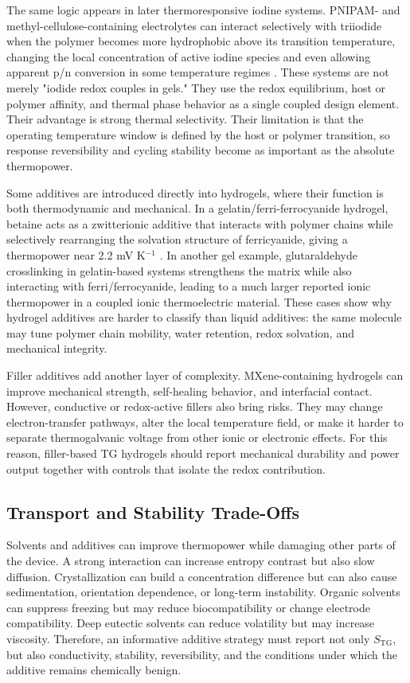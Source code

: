 The same logic appears in later thermoresponsive iodine systems. PNIPAM- and
methyl-cellulose-containing electrolytes can interact selectively with
triiodide when the polymer becomes more hydrophobic above its transition
temperature, changing the local concentration of active iodine species and even
allowing apparent p/n conversion in some temperature regimes
\citep{duan2019pn}. These systems are not merely "iodide redox couples in
gels." They use the redox equilibrium, host or polymer affinity, and thermal
phase behavior as a single coupled design element. Their advantage is strong
thermal selectivity. Their limitation is that the operating temperature window is
defined by the host or polymer transition, so response reversibility and
cycling stability become as important as the absolute thermopower.

Some additives are introduced directly into hydrogels, where their function is
both thermodynamic and mechanical. In a gelatin/ferri-ferrocyanide hydrogel,
betaine acts as a zwitterionic additive that interacts
with polymer chains while selectively rearranging the solvation structure of
ferricyanide, giving a thermopower near 2.2 mV K$^{-1}$
\citep{lu2024zwitterion}. In another gel example, glutaraldehyde crosslinking in
gelatin-based systems strengthens the matrix while also interacting with
ferri/ferrocyanide, leading to a much larger reported ionic thermopower in a
coupled ionic thermoelectric material. These cases
show why hydrogel additives are harder to classify than liquid additives: the
same molecule may tune polymer chain mobility, water retention, redox
solvation, and mechanical integrity.

Filler additives add another layer of complexity. MXene-containing hydrogels can
improve mechanical strength, self-healing behavior, and interfacial contact.
However, conductive or redox-active fillers also bring
risks. They may change electron-transfer pathways, alter the local temperature
field, or make it harder to separate thermogalvanic voltage from other ionic or
electronic effects. For this reason, filler-based TG hydrogels should report
mechanical durability and power output together with controls that isolate the
redox contribution.

\subsection{Transport and Stability Trade-Offs}

Solvents and additives can improve thermopower while damaging other parts of
the device. A strong interaction can increase entropy contrast but also slow
diffusion. Crystallization can build a concentration difference but can also
cause sedimentation, orientation dependence, or long-term instability. Organic
solvents can suppress freezing but may reduce biocompatibility or change
electrode compatibility. Deep eutectic solvents can reduce volatility but may
increase viscosity. Therefore, an informative additive strategy must report not only
$S_{\mathrm{TG}}$, but also conductivity, stability, reversibility, and the
conditions under which the additive remains chemically benign.

